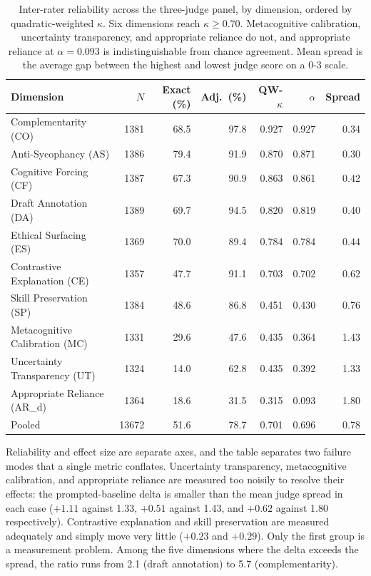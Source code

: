 \documentclass{article}
\begin{document}
\begin{table}[h]
\centering
\caption{Inter-rater reliability across the three-judge panel, by dimension, ordered by quadratic-weighted $\kappa$. Six dimensions reach $\kappa \geq 0.70$. Metacognitive calibration, uncertainty transparency, and appropriate reliance do not, and appropriate reliance at $\alpha = 0.093$ is indistinguishable from chance agreement. Mean spread is the average gap between the highest and lowest judge score on a 0-3 scale.}
\label{tab:irr}
\small
\begin{tabular}{lrrrrrr}
\toprule
\textbf{Dimension} & \textbf{$N$} & \textbf{Exact (\%)} & \textbf{Adj.\ (\%)} & \textbf{QW-$\kappa$} & \textbf{$\alpha$} & \textbf{Spread} \\
\midrule
Complementarity (CO) & 1381 & 68.5 & 97.8 & 0.927 & 0.927 & 0.34 \\
Anti-Sycophancy (AS) & 1386 & 79.4 & 91.9 & 0.870 & 0.871 & 0.30 \\
Cognitive Forcing (CF) & 1387 & 67.3 & 90.9 & 0.863 & 0.861 & 0.42 \\
Draft Annotation (DA) & 1389 & 69.7 & 94.5 & 0.820 & 0.819 & 0.40 \\
Ethical Surfacing (ES) & 1369 & 70.0 & 89.4 & 0.784 & 0.784 & 0.44 \\
Contrastive Explanation (CE) & 1357 & 47.7 & 91.1 & 0.703 & 0.702 & 0.62 \\
\midrule
Skill Preservation (SP) & 1384 & 48.6 & 86.8 & 0.451 & 0.430 & 0.76 \\
Metacognitive Calibration (MC) & 1331 & 29.6 & 47.6 & 0.435 & 0.364 & 1.43 \\
Uncertainty Transparency (UT) & 1324 & 14.0 & 62.8 & 0.435 & 0.392 & 1.33 \\
Appropriate Reliance (AR\_d) & 1364 & 18.6 & 31.5 & 0.315 & 0.093 & 1.80 \\
\midrule
Pooled & 13672 & 51.6 & 78.7 & 0.701 & 0.696 & 0.78 \\
\bottomrule
\end{tabular}
\end{table}

Reliability and effect size are separate axes, and the table separates two failure modes that a single metric conflates. Uncertainty transparency, metacognitive calibration, and appropriate reliance are measured too noisily to resolve their effects: the prompted-baseline delta is smaller than the mean judge spread in each case ($+1.11$ against 1.33, $+0.51$ against 1.43, and $+0.62$ against 1.80 respectively). Contrastive explanation and skill preservation are measured adequately and simply move very little ($+0.23$ and $+0.29$). Only the first group is a measurement problem. Among the five dimensions where the delta exceeds the spread, the ratio runs from 2.1 (draft annotation) to 5.7 (complementarity).
\end{document}
